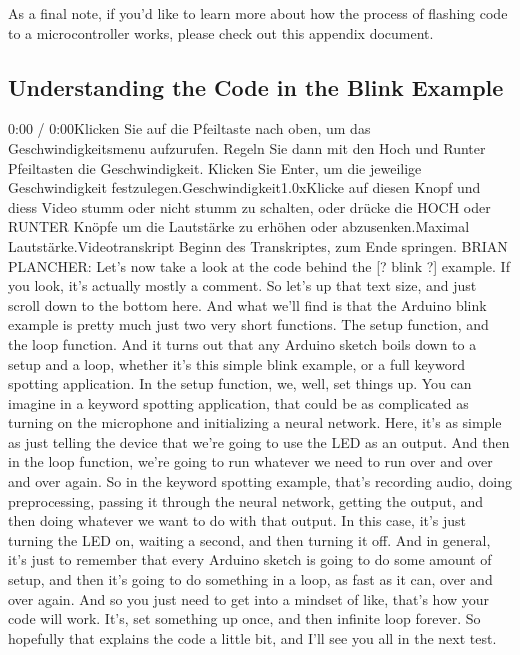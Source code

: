 As a final note, if you’d like to learn more about how the process of flashing code to a microcontroller works, please check out this appendix document.


    
\subsection{Understanding the Code in the Blink Example}


0:00 / 0:00Klicken Sie auf die Pfeiltaste nach oben, um das Geschwindigkeitsmenu aufzurufen. Regeln Sie dann mit den Hoch und Runter Pfeiltasten die Geschwindigkeit. Klicken Sie Enter, um die jeweilige Geschwindigkeit festzulegen.Geschwindigkeit1.0xKlicke auf diesen Knopf und diess Video stumm oder nicht stumm zu schalten, oder drücke die HOCH oder RUNTER Knöpfe um die Lautstärke zu erhöhen oder abzusenken.Maximal Lautstärke.Videotranskript
Beginn des Transkriptes, zum Ende springen.
BRIAN PLANCHER: Let's now take a look at the code behind the [? blink ?]
example.
If you look, it's actually mostly a comment.
So let's up that text size, and just scroll down to the bottom here.
And what we'll find is that the Arduino blink example is pretty much just two
very short functions.
The setup function, and the loop function.
And it turns out that any Arduino sketch boils down to a setup and a loop,
whether it's this simple blink example, or a full keyword spotting application.
In the setup function, we, well, set things up.
You can imagine in a keyword spotting application, that
could be as complicated as turning on the microphone
and initializing a neural network.
Here, it's as simple as just telling the device that we're
going to use the LED as an output.
And then in the loop function, we're going
to run whatever we need to run over and over and over again.
So in the keyword spotting example, that's
recording audio, doing preprocessing, passing it through the neural network,
getting the output, and then doing whatever
we want to do with that output.
In this case, it's just turning the LED on, waiting a second,
and then turning it off.
And in general, it's just to remember that every Arduino sketch is
going to do some amount of setup, and then it's
going to do something in a loop, as fast as it can, over and over again.
And so you just need to get into a mindset of like,
that's how your code will work.
It's, set something up once, and then infinite loop forever.
So hopefully that explains the code a little bit,
and I'll see you all in the next test.

